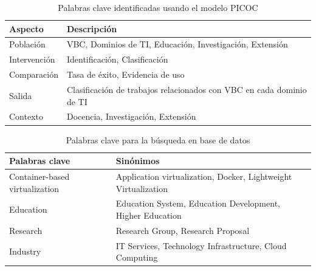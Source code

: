 \begin{table}[tbp]
    \scriptsize %
    \centering
    \renewcommand{\arraystretch}{1.3}
    \begin{tabularx}{\columnwidth}{>{\centering\arraybackslash}m{} >{\RaggedRight\arraybackslash}X}
        \hline
        \textbf{Aspecto} & \textbf{Descripción} \\
        \hline
        Población & VBC, Dominios de TI, Educación, Investigación, Extensión \\
        Intervención & Identificación, Clasificación \\
        Comparación & Tasa de éxito, Evidencia de uso \\
        Salida & Clasificación de trabajos relacionados con VBC en cada dominio de TI \\
        Contexto & Docencia, Investigación, Extensión \\
        \hline
    \end{tabularx}
    \caption{Palabras clave identificadas usando el modelo PICOC}\label{tab:palabras-clave}
\end{table}

\begin{table}[tbp]
    \scriptsize %
    \centering
    \renewcommand{\arraystretch}{1.3}
    \begin{tabularx}{\columnwidth}{>{\centering\arraybackslash}m{} >{\RaggedRight\arraybackslash}X}
        \hline
        \textbf{Palabras clave} & \textbf{Sinónimos} \\
        \hline
        Container-based virtualization & Application virtualization, Docker, Lightweight Virtualization \\
        Education & Education System, Education Development, Higher Education \\
        Research & Research Group, Research Proposal \\
        Industry & IT Services, Technology Infrastructure, Cloud Computing \\
        \hline
    \end{tabularx}
    \caption{Palabras clave para la búsqueda en base de datos}\label{tab:keywords}
\end{table}











